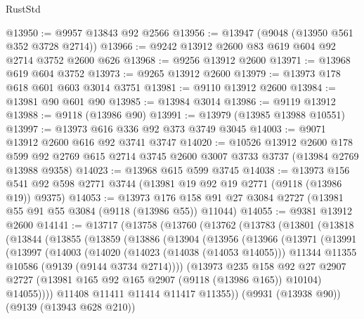 \begin{lexlean}{RustStd}
\begin{coremodule}
@13950 := @9957 @13843 @92 @2566
@13956 := @13947 (@9048 (@13950 @561 @352 @3728 @2714))
@13966 := @9242 @13912 @2600 @83 @619 @604 @92 @2714 @3752 @2600 @626
@13968 := @9256 @13912 @2600
@13971 := @13968 @619 @604 @3752
@13973 := @9265 @13912 @2600
@13979 := @13973 @178 @618 @601 @603 @3014 @3751
@13981 := @9110 @13912 @2600
@13984 := @13981 @90 @601 @90
@13985 := @13984 @3014
@13986 := @9119 @13912
@13988 := @9118 (@13986 @90)
@13991 := @13979 (@13985 @13988 @10551)
@13997 := @13973 @616 @336 @92 @373 @3749 @3045
@14003 := @9071 @13912 @2600 @616 @92 @3741 @3747
@14020 := @10526
    @13912
    @2600
    @178
    @599
    @92
    @2769
    @615
    @2714
    @3745
    @2600
    @3007
    @3733
    @3737
    (@13984 @2769 @13988 @9358)
@14023 := @13968 @615 @599 @3745
@14038 := @13973
    @156
    @541
    @92
    @598
    @2771
    @3744
    (@13981 @19 @92 @19 @2771 (@9118 (@13986 @19)) @9375)
@14053 := @13973
    @176
    @158
    @91
    @27
    @3084
    @2727
    (@13981 @55 @91 @55 @3084 (@9118 (@13986 @55)) @11044)
@14055 := @9381 @13912 @2600
@14141 := @13717
    (@13758
      (@13760
        (@13762
          (@13783
            (@13801
              (@13818
                (@13844
                  (@13855
                    (@13859
                      (@13886
                        (@13904
                          (@13956
                            (@13966
                              (@13971
                                (@13991
                                  (@13997
                                    (@14003
                                      (@14020
                                        (@14023 (@14038 (@14053 @14055)))
                                        @11344
                                        @11355
                                        @10586
                                        (@9139 (@9144 @3734 @2714))))
                                    (@13973
                                      @235
                                      @158
                                      @92
                                      @27
                                      @2907
                                      @2727
                                      (@13981 @165 @92 @165 @2907 (@9118 (@13986 @165)) @10104)
                                      @14055))))
                              @11408
                              @11411
                              @11414
                              @11417
                              @11355))
                          (@9931 (@13938 @90))
                          (@9139 (@13943 @628 @210))

\end{coremodule}
\end{lexlean}
